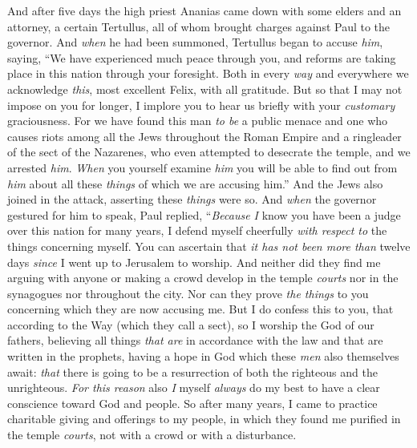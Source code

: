 \begin{biblechapter} %
 And after five days the high priest Ananias came down with some elders and an attorney, a certain Tertullus, all of whom brought charges against Paul to the governor.
\verse And \textit{when} he had been summoned, Tertullus began to accuse \textit{him}, saying, “We have experienced much peace through you, and reforms are taking place in this nation through your foresight.
\verse Both in every \textit{way} and everywhere we acknowledge \textit{this}, most excellent Felix, with all gratitude.
\verse But so that I may not impose on you for longer, I implore you to hear us briefly with your \textit{customary} graciousness.
\verse For we have found this man \textit{to be} a public menace and one who causes riots among all the Jews throughout the Roman Empire and a ringleader of the sect of the Nazarenes,
\verse who even attempted to desecrate the temple, and we arrested \textit{him﻿}.
\verse \textit{When} you yourself examine \textit{him} you will be able to find out from \textit{him} about all these \textit{things} of which we are accusing him.”
\verse And the Jews also joined in the attack, asserting these \textit{things} were so.
\verse And \textit{when} the governor gestured for him to speak, Paul replied, “\textit{Because I} know you have been a judge over this nation for many years, I defend myself cheerfully \textit{with respect to} the things concerning myself.
\verse You can ascertain that \textit{it has not been more than} twelve days \textit{since} I went up to Jerusalem to worship.
\verse And neither did they find me arguing with anyone or making a crowd develop in the temple \textit{courts} nor in the synagogues nor throughout the city.
\verse Nor can they prove \textit{the things} to you concerning which they are now accusing me.
\verse But I do confess this to you, that according to the Way (which they call a sect), so I worship the God of our fathers, believing all things \textit{that are} in accordance with the law and that are written in the prophets,
\verse having a hope in God which these \textit{men} also themselves await: \textit{that} there is going to be a resurrection of both the righteous and the unrighteous.
\verse \textit{For this reason} also \textit{I} myself \textit{always} do my best to have a clear conscience toward God and people.
\verse So after many years, I came to practice charitable giving and offerings to my people,
\verse in which they found me purified in the temple \textit{courts}, not with a crowd or with a disturbance.

\end{biblechapter}
